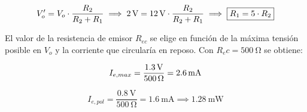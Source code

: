 \begin{equation}
	\centering
	V_o' = V_o \cdot \frac{R_2}{R_2 + R_1} \implies \SI{2}{\volt} = \SI{12}{\volt} \cdot \frac{R_2}{R_2 + R_1} \implies \boxed{R_1 = 5 \cdot R_2}
	\end{equation}

	El valor de la resistencia de emisor $R_{ec}$ se elige en función de la máxima tensión posible en $V_o$ y la corriente que circularía en reposo. Con $R_ec = \SI{500}{\ohm}$ se obtiene:

	\begin{equation}
		\centering
		I_{e,max} = \frac{ \SI{1.3}{\volt} }{ \SI{500}{\ohm} } = \SI{2.6}{\milli\ampere}
	\end{equation}

	\begin{equation}
		I_{e,pol} = \frac{ \SI{0.8}{\volt} }{ \SI{500}{\ohm} } = \SI{1.6}{\milli\ampere} \implies \SI{1.28}{\milli\watt}
	\end{equation}

